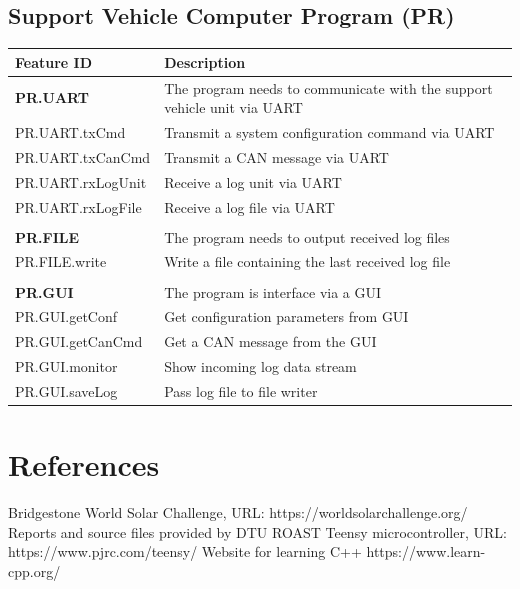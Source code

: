 \documentclass[]{article}
\begin{document}
\subsection{Support Vehicle Computer Program (PR)}
\begin{table}[H]
    \centering
    \begin{tabular}{|l|l|}
    \hline
        \textbf{Feature ID} & \textbf{Description} \\ \hline
        \textbf{PR.UART} & The program needs to communicate with the support vehicle unit via UART \\ \hline
        PR.UART.txCmd & Transmit a system configuration command via UART \\ \hline
        PR.UART.txCanCmd & Transmit a CAN message via UART \\ \hline
        PR.UART.rxLogUnit & Receive a log unit via UART \\ \hline
        PR.UART.rxLogFile & Receive a log file via UART \\ \hline
         &  \\ \hline
        \textbf{PR.FILE} & The program needs to output received log files \\ \hline
        PR.FILE.write & Write a file containing the last received log file \\ \hline
         &  \\ \hline
        \textbf{PR.GUI} & The program is interface via a GUI \\ \hline
        PR.GUI.getConf & Get configuration parameters from GUI \\ \hline
        PR.GUI.getCanCmd & Get a CAN message from the GUI \\ \hline
        PR.GUI.monitor & Show incoming log data stream \\ \hline
        PR.GUI.saveLog & Pass log file to file writer \\ \hline
    \end{tabular}
\end{table}

\section{References}
\begingroup
\renewcommand{\section}[2]{}%
\begin{thebibliography}{}
Bridgestone World Solar Challenge, 
URL: https://worldsolarchallenge.org/
Reports and source files provided by DTU ROAST
Teensy microcontroller,
URL: https://www.pjrc.com/teensy/
Website for learning C++
https://www.learn-cpp.org/
\end{thebibliography}
\endgroup
\end{document}

